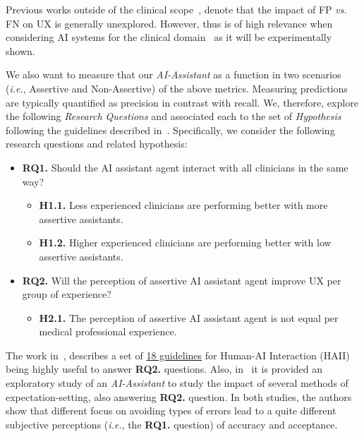 Previous works outside of the clinical scope~\cite{Kocielnik:2019:YAI:3290605.3300641, Dove:2017:UDI:3025453.3025739}, denote that the impact of FP {\it vs.} FN on UX is generally unexplored.
However, thus is of high relevance when considering AI systems for the clinical domain~\cite{boughey2016identification, dialani2015role} as it will be experimentally shown.

We also want to measure that our \textit{AI-Assistant} as a function in two scenarios ({\it i.e.}, Assertive and Non-Assertive) of the above metrics.
Measuring predictions are typically quantified as precision in contrast with recall.
We, therefore, explore the following {\it Research Questions} and associated each to the set of {\it Hypothesis} following the guidelines described in~\cite{10.1145/3290605.3300233, Kocielnik:2019:YAI:3290605.3300641}.
Specifically, we consider the following research questions and related hypothesis:

\begin{itemize}
\item {\bf RQ1.} Should the AI assistant agent interact with all clinicians in the same way?
\begin{itemize}
\item {\bf H1.1.} Less experienced clinicians are performing better with more assertive assistants.
\item {\bf H1.2.} Higher experienced clinicians are performing better with low assertive assistants.
\end{itemize}
\item {\bf RQ2.} Will the perception of assertive AI assistant agent improve UX per group of experience?
\begin{itemize}
\item {\bf H2.1.} The perception of assertive AI assistant agent is not equal per medical professional experience.
\end{itemize}
\end{itemize}

The work in~\cite{10.1145/3290605.3300233}, describes a set of \underline{18 guidelines} for Human-AI Interaction (HAII) being highly useful to answer {\bf RQ2.} questions.
Also, in~\cite{Kocielnik:2019:YAI:3290605.3300641} it is provided  an exploratory study of an {\it AI-Assistant} to study the impact of several methods of expectation-setting, also answering {\bf RQ2.} question.
In both studies, the authors show that different focus on avoiding types of errors lead to a quite different subjective perceptions ({\it i.e.}, the {\bf RQ1.} question) of accuracy and acceptance.

\break